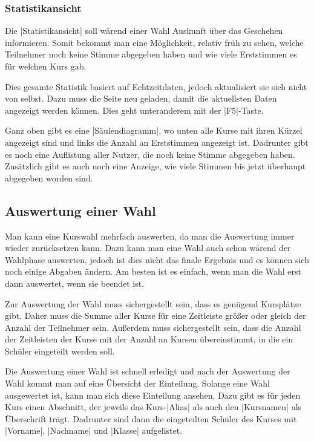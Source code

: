 \documentclass[ngerman]{ltxdoc}
\begin{document}
\subsubsection{Statistikansicht}

Die |Statistikansicht| soll wärend einer Wahl Auskunft über das Geschehen informieren.
Somit bekommt man eine Möglichkeit, relativ früh zu sehen, welche Teilnehmer noch
keine Stimme abgegeben haben und wie viele Erststimmen es für welchen Kurs gab.

Dies gesamte Statistik basiert auf Echtzeitdaten, jedoch aktualisiert sie sich
nicht von selbst. Dazu muss die Seite neu geladen, damit die aktuellsten Daten
angezeigt werden können. Dies geht unteranderem mit der |F5|-Taste.

Ganz oben gibt es eine |Säulendiagramm|, wo unten alle Kurse mit ihren Kürzel
angezeigt sind und links die Anzahl an Erststimmen angezeigt ist. Dadrunter gibt
es noch eine Auflistung aller Nutzer, die noch keine Stimme abgegeben haben. Zusätzlich
gibt es auch noch eine Anzeige, wie viele Stimmen bis jetzt überhaupt abgegeben worden
sind.

\subsection{Auswertung einer Wahl}

Man kann eine Kurswahl mehrfach auswerten, da man die Auswertung immer wieder
zurücksetzen kann. Dazu kann man eine Wahl auch schon wärend der Wahlphase auswerten,
jedoch ist dies nicht das finale Ergebnis und es können sich noch einige Abgaben
ändern. Am besten ist es einfach, wenn man die Wahl erst dann auswertet, wenn sie
beendet ist.

Zur Auswertung der Wahl muss sichergestellt sein, dass es genügend Kursplätze gibt.
Daher muss die Summe aller Kurse für eine Zeitleiste größer oder gleich der
Anzahl der Teilnehmer sein. Außerdem muss sichergestellt sein, dass die Anzahl
der Zeitleisten der Kurse mit der Anzahl an Kursen übereinstimmt, in die ein Schüler
eingeteilt werden soll.

Die Auswertung einer Wahl ist schnell erledigt und nach der Auswertung der Wahl
kommt man auf eine Übersicht der Einteilung. Solange eine Wahl ausgewertet ist,
kann man sich diese Einteilung ansehen. Dazu gibt es für jeden Kurs einen Abschnitt,
der jeweils das Kurs-|Alias| als auch den |Kursnamen| als Überschrift trägt.
Dadrunter sind dann die eingeteilten Schüler des Kurses mit |Vorname|, |Nachname|
und |Klasse| aufgelistet.
\end{document}
